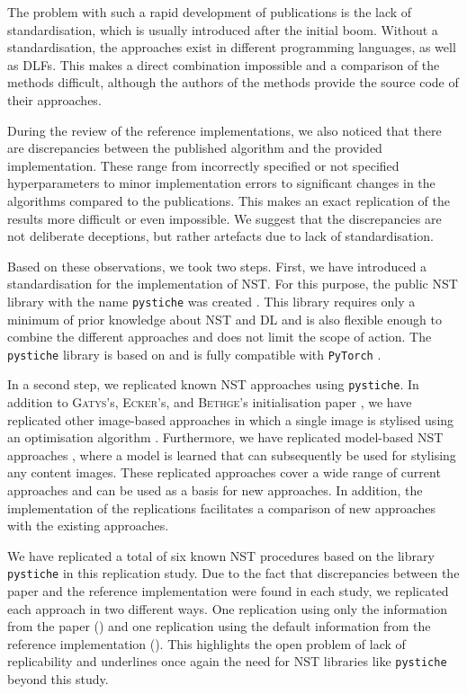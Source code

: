 The problem with such a rapid development of publications is the lack of standardisation, which is usually introduced after the initial boom. Without a standardisation, the approaches exist in different programming languages, as well as \glspl{DLF}. This makes a direct combination impossible and a comparison of the methods difficult, although the authors of the methods provide the source code of their approaches. 

During the review of the reference implementations, we also noticed that there are discrepancies between the published algorithm and the provided implementation. These range from incorrectly specified or not specified hyperparameters to minor implementation errors to significant changes in the algorithms compared to the publications. This makes an exact replication of the results more difficult or even impossible. We suggest that the discrepancies are not deliberate deceptions, but rather artefacts due to lack of standardisation. 

Based on these observations, we took two steps. First, we have introduced a standardisation for the implementation of \gls{NST}. For this purpose, the public \gls{NST} library with the name \texttt{pystiche} was created \cite{ML2020}. This library requires only a minimum of prior knowledge about \gls{NST} and \gls{DL} and is also flexible enough to combine the different approaches and does not limit the scope of action. The \texttt{pystiche} library is based on and is fully compatible with \texttt{PyTorch} \cite{PGM+2019}. 

In a second step, we replicated known \gls{NST} approaches using \texttt{pystiche}. In addition to \textsc{Gatys}'s, \textsc{Ecker}'s, and \textsc{Bethge}'s initialisation paper \cite{GEB2016}, we have replicated other image-based approaches in which a single image is stylised using an optimisation algorithm \cite{LW2016,GEB+2017}. Furthermore, we have replicated model-based \gls{NST} approaches \cite{JAL2016,ULVL2016,UVL2017}, where a model is learned that can subsequently be used for stylising any content images. These replicated approaches cover a wide range of current approaches and can be used as a basis for new approaches. In addition, the implementation of the replications facilitates a comparison of new approaches with the existing approaches. 

We have replicated a total of six known \gls{NST} procedures based on the library \texttt{pystiche} in this replication study. Due to the fact that discrepancies between the paper and the reference implementation were found in each study, we replicated each approach in two different ways. One replication using only the information from the paper (\paper{}) and one replication using the default information from the reference implementation (\implementation{}). This highlights the open problem of lack of replicability and underlines once again the need for \gls{NST} libraries like \texttt{pystiche} beyond this study.

